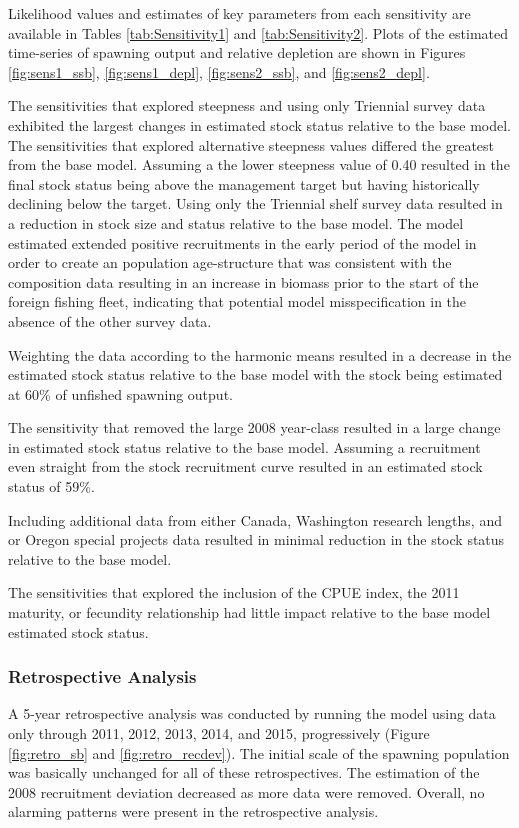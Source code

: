\documentclass[12pt,]{article}
\begin{document}
Likelihood values and estimates of key parameters from each sensitivity
are available in Tables \ref{tab:Sensitivity1} and
\ref{tab:Sensitivity2}. Plots of the estimated time-series of spawning
output and relative depletion are shown in Figures \ref{fig:sens1_ssb},
\ref{fig:sens1_depl}, \ref{fig:sens2_ssb}, and \ref{fig:sens2_depl}.

The sensitivities that explored steepness and using only Triennial
survey data exhibited the largest changes in estimated stock status
relative to the base model. The sensitivities that explored alternative
steepness values differed the greatest from the base model. Assuming a
the lower steepness value of 0.40 resulted in the final stock status
being above the management target but having historically declining
below the target. Using only the Triennial shelf survey data resulted in
a reduction in stock size and status relative to the base model. The
model estimated extended positive recruitments in the early period of
the model in order to create an population age-structure that was
consistent with the composition data resulting in an increase in biomass
prior to the start of the foreign fishing fleet, indicating that
potential model misspecification in the absence of the other survey
data.

Weighting the data according to the harmonic means resulted in a
decrease in the estimated stock status relative to the base model with
the stock being estimated at 60\% of unfished spawning output.

The sensitivity that removed the large 2008 year-class resulted in a
large change in estimated stock status relative to the base model.
Assuming a recruitment even straight from the stock recruitment curve
resulted in an estimated stock status of 59\%.

Including additional data from either Canada, Washington research
lengths, and or Oregon special projects data resulted in minimal
reduction in the stock status relative to the base model.

The sensitivities that explored the inclusion of the CPUE index, the
2011 maturity, or fecundity relationship had little impact relative to
the base model estimated stock status.

\subsubsection{Retrospective Analysis}\label{retrospective-analysis}

A 5-year retrospective analysis was conducted by running the model using
data only through 2011, 2012, 2013, 2014, and 2015, progressively
(Figure \ref{fig:retro_sb} and \ref{fig:retro_recdev}). The initial
scale of the spawning population was basically unchanged for all of
these retrospectives. The estimation of the 2008 recruitment deviation
decreased as more data were removed. Overall, no alarming patterns were
present in the retrospective analysis.
\end{document}

